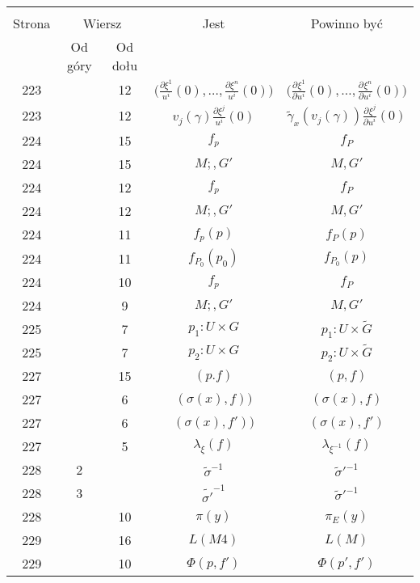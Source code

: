 \documentclass[a4paper,11pt]{article}
\newcommand{\fr}{\frac}
\newcommand{\pr}{\partial}
\newcommand{\ld}{\ldots}
\newcommand{\ti}{\times}
\newcommand{\ga}{\gamma}
\newcommand{\la}{\lambda}
\newcommand{\s}{\sigma}
\newcommand{\wt}{\widetilde}
\newcommand{\pd}[3]{\frac{ \pr^{ #1 } { #2 } }{ \pr { #3 }^{ #1 } }}
\begin{document}
\begin{center}
  \begin{tabular}{|c|c|c|c|c|}
    \hline
    & \multicolumn{2}{c|}{} & & \\
    Strona & \multicolumn{2}{c|}{Wiersz}& Jest & Powinno być \\ \cline{2-3}
    & Od góry & Od dołu &  &  \\ \hline
    223 & & 12 & $\big( \fr{ \pr \xi^{ 1 } }{ u^{ i } }( 0 ), \ld,
                 \fr{ \pr \xi^{ n } }{ u^{ i } }( 0 ) \big)$
           & $\big( \pd{}{ { \xi^{ 1 } } }{ { u^{ i } } }( 0 ), \ld,
             \pd{}{ { \xi^{ n } } }{ { u^{ i } } }( 0 ) \big)$ \\
    223 & & 12 & $v_{ j }( \ga ) \fr{ \pr \xi ^{ j } }{ u^{ i } }( 0 )$
           & $\wt{ \ga }_{ x }( v_{ j }( \ga ) )
             \pd{}{ { \xi ^{ j } } }{ { u^{ i } } }( 0 )$ \\
    224 & & 15 & $f_{ p }$ & $f_{ P }$ \\
    224 & & 15 & $M;, G'$ & $M, G'$ \\
    224 & & 12 & $f_{ p }$ & $f_{ P }$ \\
    224 & & 12 & $M;, G'$ & $M, G'$ \\
    224 & & 11 & $f_{ p }( p )$ & $f_{ P }( p )$ \\
    224 & & 11 & $f_{ P_{ 0 } }( p_{ 0 } )$ & $f_{ P_{ 0 } }( p )$ \\
    224 & & 10 & $f_{ p }$ & $f_{ P }$ \\
    224 & &  9 & $M;, G'$ & $M, G'$ \\
    225 & &  7 & $p_{ 1 } : U \ti G$ & $p_{ 1 } : U \ti \wt{ G }$ \\
    225 & &  7 & $p_{ 2 } : U \ti G$ & $p_{ 2 } : U \ti \wt{ G }$ \\
    227 & & 15 & $( p. f )$ & $( p, f )$ \\
    227 & &  6 & $( \s( x ), f ) )$ & $( \s( x ), f )$ \\
    227 & &  6 & $( \s( x ), f' ) )$ & $( \s( x ), f' )$ \\
    227 & &  5 & $\la_{ \xi }( f )$ & $\la_{ \xi^{ -1 } }( f )$ \\
    228 & 2 & & $\wt{ \s }^{ -1 }$ & $\wt{ \s }'^{ -1 }$ \\
    228 & 3 & & $\wt{ \s' }^{ -1 }$ & $\wt{ \s }'^{ -1 }$ \\
    228 & & 10 & $\pi( y )$ & $\pi_{ E }( y )$ \\
    229 & & 16 & $L( M 4 )$ & $L( M )$ \\
    229 & & 10 & $\Phi( p, f' )$ & $\Phi( p', f' )$ \\

\end{tabular}
\end{center}
\end{document}
